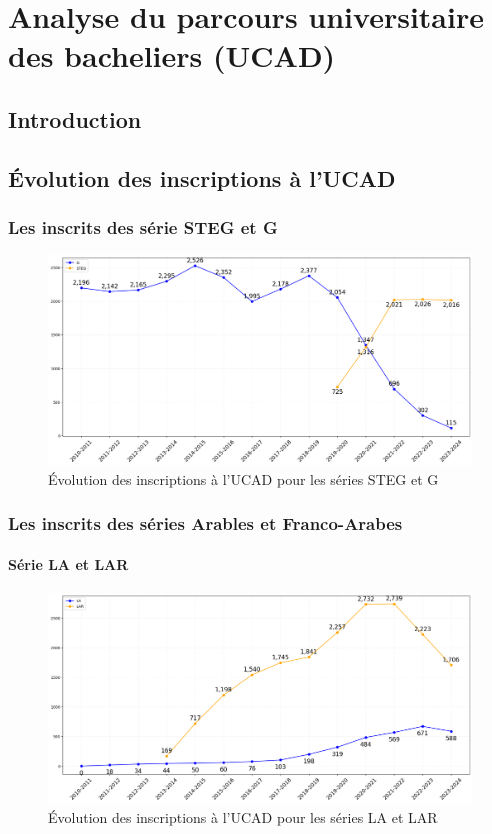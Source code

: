 \chapter{Analyse du parcours universitaire des bacheliers (UCAD)}

\section{Introduction}

\section{Évolution des inscriptions à l'UCAD}

\subsection{Les inscrits des série STEG et G}

\begin{figure}[h]
\centering
\caption{Évolution des inscriptions à l'UCAD pour les séries STEG et G}
\includegraphics[width=1\textwidth]{figure/Inscrits_ucad_STEG.png}
\end{figure}

\newpage
\subsection{Les inscrits des séries Arables et Franco-Arabes}

\subsubsection{Série LA et LAR}

\begin{figure}[h]
\centering
\caption{Évolution des inscriptions à l'UCAD pour les séries LA et LAR}
\includegraphics[width=1\textwidth]{figure/Inscrits_ucad_LA_LAR.png}
\end{figure}

